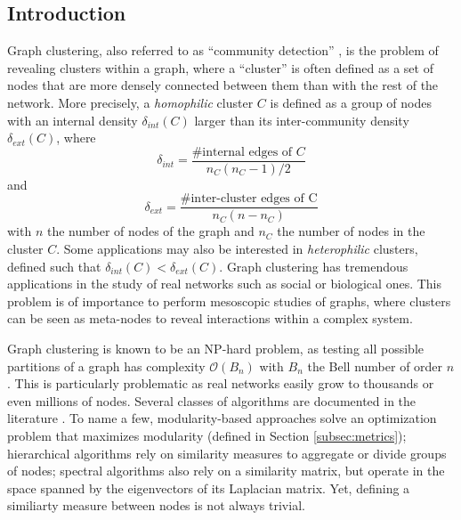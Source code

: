 \documentclass[switch, 12pt]{article}
\renewcommand{\O}{\mathcal{O}}
\begin{document}
\begin{multicols}{2}

    \section{Introduction}

    Graph clustering, also referred to as ``community detection'' \cite{fortunato_community_2010}, is the problem of revealing clusters within a graph, where a ``cluster'' is often defined as a set of nodes that are more densely connected between them than with the rest of the network.
    More precisely, a \emph{homophilic} cluster $C$ is defined as a group of nodes with an internal density $\delta_{int}(C)$ larger than its inter-community density $\delta_{ext}(C)$, where
    \begin{equation}
        \delta_{int} = \frac{\text{\# internal edges of }C}{n_C (n_C - 1) / 2}
    \end{equation}
    and
    \begin{equation}
        \delta_{ext} = \frac{\text{\# inter-cluster edges of C}}{n_C (n - n_C)}
    \end{equation}
    with $n$ the number of nodes of the graph and $n_C$ the number of nodes in the cluster $C$.
    Some applications may also be interested in \emph{heterophilic} clusters, defined such that $\delta_{int}(C) < \delta_{ext}(C)$.
    Graph clustering has tremendous applications in the study of real networks such as
    social \cite{chunaev_community_2020} or biological \cite{sah_exploring_2014} ones. This problem is of importance to perform mesoscopic studies of graphs, where clusters can be seen as meta-nodes to reveal interactions within a complex system.


    Graph clustering is known to be an NP-hard problem, as testing all possible partitions of a graph has complexity $\O(B_n)$ with $B_n$ the Bell number of order $n$. This is particularly problematic as real networks easily grow to thousands or even millions of nodes. Several classes of algorithms are documented in the literature \cite{fortunato_community_2010}. To name a few, modularity-based approaches solve an optimization problem that maximizes modularity (defined in Section \ref{subsec:metrics}); hierarchical algorithms rely on similarity measures to aggregate or divide groups of nodes; spectral algorithms also rely on a similarity matrix, but operate in the space spanned by the eigenvectors of its Laplacian matrix. Yet, defining a similiarty measure between nodes is not always trivial.


\end{multicols}
\end{document}
